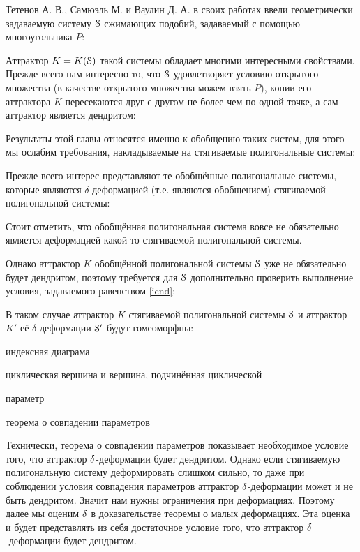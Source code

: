 Тетенов А. В., Самюэль М. и Ваулин Д. А. в своих работах \cite{TSV2017, STV2017} ввели геометрически задаваемую систему ${\EuScript S}$ сжимающих подобий, задаваемый с помощью многоугольника $P$:


Аттрактор $K=K({\EuScript S})$ такой системы обладает многими интересными свойствами.
Прежде всего нам интересно то, что ${\EuScript S}$ удовлетворяет условию открытого множества (в качестве открытого множества можем взять $\dot P$), копии его аттрактора $K$ пересекаются друг с другом не более чем по одной точке, а сам аттрактор является дендритом:


Результаты этой главы относятся именно к обобщению таких систем, для этого мы ослабим требования, накладываемые на стягиваемые полигональные системы:


Прежде всего интерес представляют те обобщённые полигональные системы, которые являются $\delta$-деформацией (т.е. являются обобщением) стягиваемой полигональной системы:


Стоит отметить, что обобщённая полигональная система вовсе не обязательно является деформацией какой-то стягиваемой полигональной системы.

Однако аттрактор $K$ обобщённой полигональной системы ${\EuScript S}$ уже не обязательно будет дендритом, поэтому требуется для ${\EuScript S}$ дополнительно проверить выполнение условия, задаваемого равенством \eqref{icnd}:


В таком случае аттрактор $K$ стягиваемой полигональной системы ${\EuScript S}$ и аттрактор $K'$ её $\delta$-деформации ${\EuScript S}'$ будут гомеоморфны:


индексная диаграма

циклическая вершина и вершина, подчинённая циклической

параметр

теорема о совпадении параметров


Технически, теорема о совпадении параметров показывает необходимое условие того, что аттрактор $\delta$-деформации будет дендритом. 
Однако если стягиваемую полигональную систему деформировать слишком сильно, то даже при соблюдении условия совпадения параметров аттрактор $\delta$-деформации может и не быть дендритом. 
Значит нам нужны ограничения при деформациях. 
Поэтому далее мы оценим $\delta$ в доказательстве теоремы о малых деформациях. 
Эта оценка и будет представлять из себя достаточное условие того, что аттрактор $\delta$-деформации будет дендритом.


